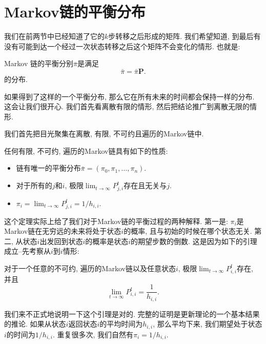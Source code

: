 \section{Markov链的平衡分布}

我们在前两节中已经知道了它的$k$步转移之后形成的矩阵. 我们希望知道, 到最后有没有可能到达一个经过一次状态转移之后这个矩阵不会变化的情形. 也就是: 

\begin{definition}
    Markov 链的平衡分别$\overline \pi$是满足
    $$
    \bar{\pi}=\bar{\pi} \mathbf{P} .
    $$
    的分布. 
\end{definition}

如果得到了这样的一个平衡分布, 那么它在所有未来的时间都会保持一样的分布. 这会让我们很开心. 我们首先看离散有限的情形, 然后把结论推广到离散无限的情形. 

我们首先把目光聚集在离散, 有限, 不可约且遍历的Markov链中. 

\begin{theorem}
    \label{thm:stab-dist-prop}
    任何有限, 不可约, 遍历的Markov链具有如下的性质: 
    \begin{itemize}
        \item 链有唯一的平衡分布$\bar{\pi}=\left(\pi_0, \pi_1, \ldots, \pi_n\right)$.
        \item 对于所有的$j$和$i$, 极限$\lim _{t \rightarrow \infty} P_{j, i}^t$存在且无关与$j$. 
        \item $\pi_i=\lim _{t \rightarrow \infty} P_{j, i}^t=1 / h_{i, i}$.
    \end{itemize}
\end{theorem}

这个定理实际上给了我们对于Markov链的平衡过程的两种解释. 第一是: $\pi_i$是Markov链在无穷远的未来将处于状态$i$的概率, 且与初始的时候在哪个状态无关. 第二, 从状态$i$出发回到状态$i$的概率是状态$i$的期望步数的倒数. 这是因为如下的引理成立--先考察从$i$到$i$情形: 

\begin{lemma}
    对于一个任意的不可约, 遍历的Markov链以及任意状态$i$, 极限$\lim _{t \rightarrow \infty} P_{i, i}^t$存在, 并且
    $$\lim _{t \rightarrow \infty} P_{i, i}^t=\frac{1}{h_{i, i}}.$$
\end{lemma}

我们来不正式地说明一下这个引理是对的. 完整的证明是更新理论的一个基本结果的推论. 如果从状态$i$返回状态$i$的平均时间为$h_{i,i}$, 那么平均下来, 我们期望处于状态$i$的时间为$1/h_{i,i}$. 重复很多次, 我们自然有$\pi_i = 1/h_{i,i}$. 

